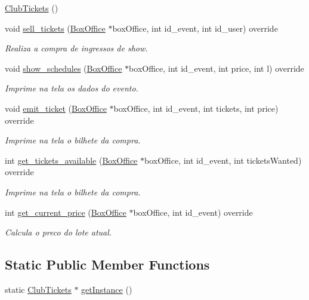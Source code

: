 \begin{DoxyCompactItemize}
\item 
\hyperlink{class_club_tickets_a88dc2bfc85b1cb4f40ad67169c1e6898}{Club\+Tickets} ()
\item 
void \hyperlink{class_club_tickets_afc1b589af88796163f9561b5c64b9667}{sell\+\_\+tickets} (\hyperlink{class_box_office}{Box\+Office} $\ast$box\+Office, int id\+\_\+event, int id\+\_\+user) override
\begin{DoxyCompactList}\small\item\em Realiza a compra de ingressos de show. \end{DoxyCompactList}\item 
void \hyperlink{class_club_tickets_a54c6301365f63a9a3894a4f949ce38a1}{show\+\_\+schedules} (\hyperlink{class_box_office}{Box\+Office} $\ast$box\+Office, int id\+\_\+event, int price, int l) override
\begin{DoxyCompactList}\small\item\em Imprime na tela os dados do evento. \end{DoxyCompactList}\item 
void \hyperlink{class_club_tickets_ab4bc6e785c0b919923577ffc2e58042b}{emit\+\_\+ticket} (\hyperlink{class_box_office}{Box\+Office} $\ast$box\+Office, int id\+\_\+event, int tickets, int price) override
\begin{DoxyCompactList}\small\item\em Imprime na tela o bilhete da compra. \end{DoxyCompactList}\item 
int \hyperlink{class_club_tickets_ad29cfeea8d924408f0ce3a01572dabfe}{get\+\_\+tickets\+\_\+available} (\hyperlink{class_box_office}{Box\+Office} $\ast$box\+Office, int id\+\_\+event, int tickets\+Wanted) override
\begin{DoxyCompactList}\small\item\em Imprime na tela o bilhete da compra. \end{DoxyCompactList}\item 
int \hyperlink{class_club_tickets_a1de83341b2457f0352e1cdd86d27e1e3}{get\+\_\+current\+\_\+price} (\hyperlink{class_box_office}{Box\+Office} $\ast$box\+Office, int id\+\_\+event) override
\begin{DoxyCompactList}\small\item\em Calcula o preco do lote atual. \end{DoxyCompactList}\end{DoxyCompactItemize}
\subsection*{Static Public Member Functions}
\begin{DoxyCompactItemize}
\item 
static \hyperlink{class_club_tickets}{Club\+Tickets} $\ast$ \hyperlink{class_club_tickets_a05bfa4f5379a6fd7229efd00e98f1e7f}{get\+Instance} ()
\end{DoxyCompactItemize}


